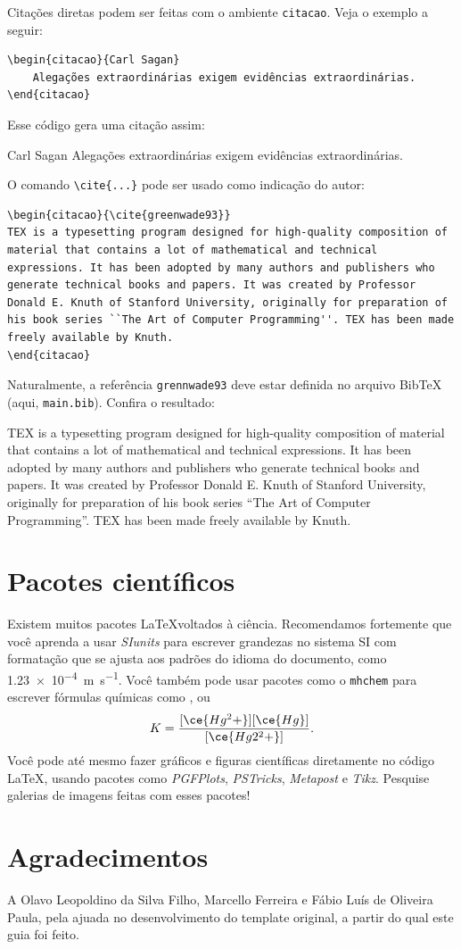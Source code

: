 \documentclass[12pt,a4paper,twoside]{article}
\begin{document}
Citações diretas podem ser feitas com o ambiente \verb|citacao|. Veja o exemplo a seguir:
\begin{verbatim}
\begin{citacao}{Carl Sagan}
    Alegações extraordinárias exigem evidências extraordinárias.
\end{citacao}
\end{verbatim}
Esse código gera uma citação assim:
\begin{citacao}{Carl Sagan}
    Alegações extraordinárias exigem evidências extraordinárias.
\end{citacao}
O comando \verb|\cite{...}| pode ser usado como indicação do autor:
\begin{verbatim}
\begin{citacao}{\cite{greenwade93}}
TEX is a typesetting program designed for high-quality composition of material that contains a lot of mathematical and technical expressions. It has been adopted by many authors and publishers who generate technical books and papers. It was created by Professor Donald E. Knuth of Stanford University, originally for preparation of his book series ``The Art of Computer Programming''. TEX has been made freely available by Knuth.
\end{citacao}
\end{verbatim}
Naturalmente, a referência \verb|grennwade93| deve estar definida no arquivo BibTeX (aqui, \verb|main.bib|). Confira o resultado:
\begin{citacao}{\cite{greenwade93}}
TEX is a typesetting program designed for high-quality composition of material that contains a lot of mathematical and technical expressions. It has been adopted by many authors and publishers who generate technical books and papers. It was created by Professor Donald E. Knuth of Stanford University, originally for preparation of his book series ``The Art of Computer Programming''. TEX has been made freely available by Knuth.
\end{citacao}

\section{Pacotes científicos}

Existem muitos pacotes \LaTeX voltados à ciência. Recomendamos fortemente que você aprenda a usar \textit{SIunits} para escrever grandezas no sistema SI com formatação que se ajusta aos padrões do idioma do documento, como \SI{1.23e-4}{\meter\per\second}.
Você também pode usar pacotes como o \verb|mhchem| para escrever fórmulas químicas como ,  ou \cite{moodle-mhchem}
\begin{equation}
    K = \frac{[\ce{Hg^2+}][\ce{Hg}]}{[\ce{Hg2^2+}]}.
    \label{eq:chem}
\end{equation}
Você pode até mesmo fazer gráficos e figuras científicas diretamente no código \LaTeX, usando pacotes como \textit{PGFPlots}, \textit{PSTricks}, \textit{Metapost} e \textit{Tikz}. Pesquise galerias de imagens feitas com esses pacotes!

\section{Agradecimentos}

A Olavo Leopoldino da Silva Filho, Marcello Ferreira e Fábio Luís de Oliveira Paula, pela ajuada no desenvolvimento do template original, a partir do qual este guia foi feito.


\end{document}
